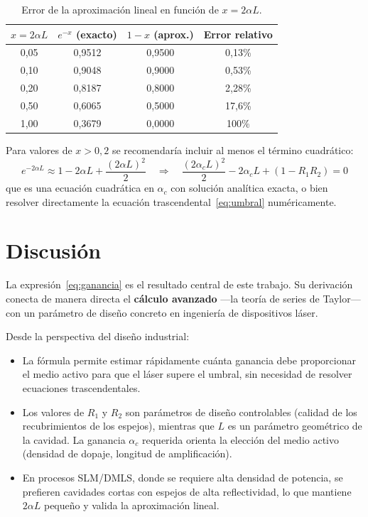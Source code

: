 \documentclass[12pt, a4paper]{article}
\begin{document}
\begin{table}[H]
  \centering
  \caption{Error de la aproximación lineal en función de $x = 2\alpha L$.}
  \label{tab:error}
  \begin{tabular}{cccc}
    \toprule
    $x = 2\alpha L$ & $e^{-x}$ (exacto) & $1 - x$ (aprox.) & Error relativo \\
    \midrule
    0{,}05 & 0{,}9512 & 0{,}9500 & 0{,}13\% \\
    0{,}10 & 0{,}9048 & 0{,}9000 & 0{,}53\% \\
    0{,}20 & 0{,}8187 & 0{,}8000 & 2{,}28\% \\
    0{,}50 & 0{,}6065 & 0{,}5000 & 17{,}6\% \\
    1{,}00 & 0{,}3679 & 0{,}0000 & 100\%    \\
    \bottomrule
  \end{tabular}
\end{table}

Para valores de $x > 0{,}2$ se recomendaría incluir al menos el término cuadrático:
%
\begin{equation}
  e^{-2\alpha L} \approx 1 - 2\alpha L + \frac{(2\alpha L)^2}{2}
  \quad \Longrightarrow \quad
  \frac{(2\alpha_c L)^2}{2} - 2\alpha_c L + (1 - R_1 R_2) = 0
\end{equation}
%
que es una ecuación cuadrática en $\alpha_c$ con solución analítica exacta, o bien resolver
directamente la ecuación trascendental~\eqref{eq:umbral} numéricamente.

\section{Discusión}

La expresión~\eqref{eq:ganancia} es el resultado central de este trabajo. Su derivación
conecta de manera directa el \textbf{cálculo avanzado} —la teoría de series de Taylor—
con un parámetro de diseño concreto en ingeniería de dispositivos láser.

Desde la perspectiva del diseño industrial:

\begin{itemize}[leftmargin=2em]
  \item La fórmula permite estimar rápidamente cuánta ganancia debe proporcionar el medio
        activo para que el láser supere el umbral, sin necesidad de resolver
        ecuaciones trascendentales.
  \item Los valores de $R_1$ y $R_2$ son parámetros de diseño controlables (calidad de los
        recubrimientos de los espejos), mientras que $L$ es un parámetro geométrico de la
        cavidad. La ganancia $\alpha_c$ requerida orienta la elección del medio activo
        (densidad de dopaje, longitud de amplificación).
  \item En procesos SLM/DMLS, donde se requiere alta densidad de potencia, se prefieren
        cavidades cortas con espejos de alta reflectividad, lo que mantiene $2\alpha L$
        pequeño y valida la aproximación lineal.
\end{itemize}
\end{document}
